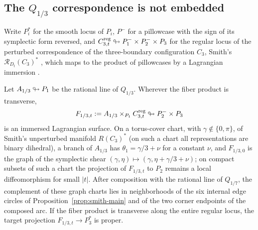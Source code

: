 \subsection{The \texorpdfstring{$Q_{1/3}$}{Q(1/3)} correspondence is not embedded}\label{ss:correspondence}
Write $P_i^*$ for the smooth locus of $P_i$, $P^-$ for a pillowcase with the sign of its symplectic
form reversed, and $C_{3,t}^{\mathrm{reg}}\looparrowright P_1^-\times P_2^-\times P_3$ for the regular locus of
the perturbed correspondence of the three-boundary configuration $C_3$, Smith's $\mathcal R_{D_t}(C_3)^*$
\cite[Def.~4.9]{Smith}, which maps
to the product of pillowcases by a Lagrangian immersion \cite[Cor.~4.11]{Smith}.

\begin{lemma}\label{lem:surface-reduction}
Let $A_{1/3}\looparrowright P_1$ be the rational line of $Q_{1/3}$.  Wherever the fiber product is transverse,
\[
 F_{1/3,t}:=A_{1/3}\times_{P_1}C_{3,t}^{\mathrm{reg}}\looparrowright P_2^-\times P_3
\]
is an immersed Lagrangian surface.  On a torus-cover chart, with $\gamma\notin\{0,\pi\}$, of Smith's
unperturbed manifold $R(C_3)^*$ \cite[Def.~3.6]{Smith} (on such a chart all representations are binary dihedral), a branch of $A_{1/3}$ has $\theta_1=\gamma/3+\nu$ for a constant $\nu$, and $F_{1/3,0}$ is the graph
of the symplectic shear $(\gamma,\eta)\mapsto(\gamma,\eta+\gamma/3+\nu)$; on compact subsets of such a
chart the projection of $F_{1/3,t}$ to $P_2$ remains a local diffeomorphism for small $|t|$.  After
composition with the rational line of $Q_{1/7}$, the complement of these graph charts lies in
neighborhoods of the six internal edge circles of Proposition~\ref{prop:smith-main} and of the two
corner endpoints of the composed arc.  If the fiber product is transverse along the entire regular
locus, the target projection $F_{1/3,t}\to P_3^*$ is proper.
\end{lemma}

